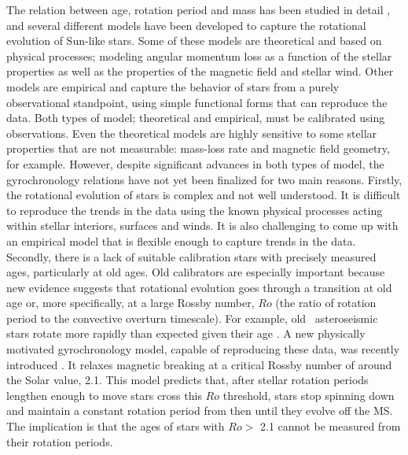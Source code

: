 
The relation between age, rotation period and mass has been studied in detail
, and several different models have been developed to
capture the rotational evolution of Sun-like stars.
Some of these models are theoretical and based on physical processes; modeling
angular momentum loss as a function of the stellar properties as well as the
properties of the magnetic field and stellar wind.
Other models are empirical and capture the behavior of stars from a purely
observational standpoint, using simple functional forms that can reproduce the
data.
Both types of model; theoretical and empirical, must be calibrated using
observations.
Even the theoretical models are highly sensitive to some stellar properties
that are not measurable: mass-loss rate and magnetic field geometry, for
example.
However, despite significant advances in both types of model,
the gyrochronology relations have not yet been finalized for two main reasons.
Firstly, the rotational evolution of stars is complex and not well understood.
It is difficult to reproduce the trends in the data using the known physical
processes acting within stellar interiors, surfaces and winds.
It is also challenging to come up with an empirical model that is flexible
enough to capture trends in the data.
Secondly, there is a lack of suitable calibration stars with precisely
measured ages, particularly at old ages.  %
Old calibrators are especially important because new evidence suggests that
rotational evolution goes through a transition at old age or, more
specifically, at a large Rossby number, $Ro$ (the ratio of rotation period to
the convective overturn timescale).
For example, old \kepler\ asteroseismic stars rotate more rapidly than
expected given their age \citep[\eg][]{angus2015, vansaders2016}.
A new physically motivated gyrochronology model, capable of reproducing these
data, was recently introduced \citep{vansaders2016}.
It relaxes magnetic breaking at a critical Rossby number of around the Solar
value, 2.1.
This model predicts that, after stellar rotation periods lengthen enough to
move stars cross this $Ro$ threshold, stars stop spinning down and maintain a
constant rotation period from then until they evolve off the MS.
The implication is that the ages of stars with $Ro >$ 2.1 cannot be measured
from their rotation periods.

